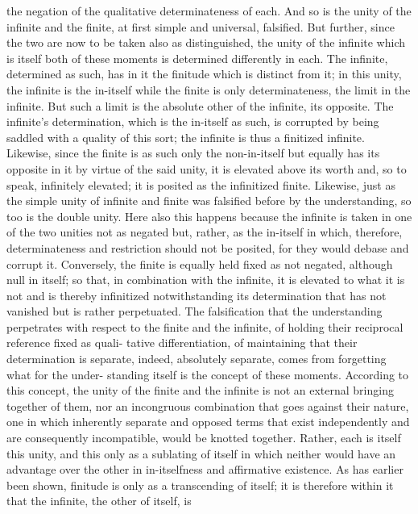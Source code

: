the negation of the qualitative determinateness of each. And so is the unity
of the infinite and the finite, at first simple and universal, falsified.
But further, since the two are now to be taken also as distinguished, the
unity of the infinite which is itself both of these moments is determined
differently in each. The infinite, determined as such, has in it the finitude
which is distinct from it; in this unity, the infinite is the in-itself while the
finite is only determinateness, the limit in the infinite. But such a limit is
the absolute other of the infinite, its opposite. The infinite’s determination,
which is the in-itself as such, is corrupted by being saddled with a quality
of this sort; the infinite is thus a finitized infinite. Likewise, since the finite
is as such only the non-in-itself but equally has its opposite in it by virtue
of the said unity, it is elevated above its worth and, so to speak, infinitely
elevated; it is posited as the infinitized finite.
Likewise, just as the simple unity of infinite and finite was falsified before
by the understanding, so too is the double unity. Here also this happens
because the infinite is taken in one of the two unities not as negated but,
rather, as the in-itself in which, therefore, determinateness and restriction
should not be posited, for they would debase and corrupt it. Conversely,
the finite is equally held fixed as not negated, although null in itself; so
that, in combination with the infinite, it is elevated to what it is not and is
thereby infinitized notwithstanding its determination that has not vanished
but is rather perpetuated.
The falsification that the understanding perpetrates with respect to the
finite and the infinite, of holding their reciprocal reference fixed as quali-
tative differentiation, of maintaining that their determination is separate,
indeed, absolutely separate, comes from forgetting what for the under-
standing itself is the concept of these moments. According to this concept,
the unity of the finite and the infinite is not an external bringing together of
them, nor an incongruous combination that goes against their nature, one
in which inherently separate and opposed terms that exist independently
and are consequently incompatible, would be knotted together. Rather,
each is itself this unity, and this only as a sublating of itself in which neither
would have an advantage over the other in in-itselfness and affirmative
existence. As has earlier been shown, finitude is only as a transcending
of itself; it is therefore within it that the infinite, the other of itself, is
